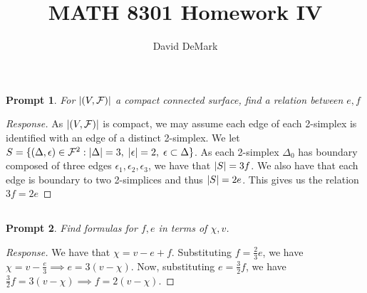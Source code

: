 \documentclass[english]{article}
\title{MATH 8301 Homework IV}
\author{David DeMark}
\date{\due}
\newcommand{\prompt}[1]{\begin{prompt*}
		#1
\end{prompt*}}
\DeclarePairedDelimiter\abs{\lvert}{\rvert}%
\newcommand{\prob}[1]{\setcounter{section}{#1-1}\section{}}
\newcommand{\prt}[1]{\setcounter{subsection}{#1-1}\subsection{}}
\newtheorem*{prompt*}{Prompt}
\theoremstyle{remark}
\theoremstyle{definition}
\newcommand{\Fcal}{\mathcal{F}}
\begin{document}
	\maketitle
\prob{1}
\prt{1} \prompt{For $\abs{(V,\Fcal)}$ a compact connected surface, find a relation between $e,f$}
\begin{proof}[Response]
As $\abs{(V,\Fcal)}$ is compact, we may assume each edge of each 2-simplex is identified with an edge of a distinct 2-simplex. We let $S=\{(\Delta, \epsilon)\in \Fcal^2:\abs{\Delta}=3,\;\abs{\epsilon}=2,\;\epsilon\subset \Delta\}$. As each 2-simplex $\Delta_0$ has boundary composed of three edges $\epsilon_1,\epsilon_2,\epsilon_3$, we have that $\abs{S}=3f$. We also have that each edge is boundary to two 2-simplices and thus $\abs{S}=2e$. This gives us the relation $3f=2e$
\end{proof}
\prt{2}\prompt{Find formulas for $f,e$ in terms of $\chi,v$.}
	\begin{proof}[Response]
We have that $\chi=v-e+f$. Substituting $f=\frac{2}{3}e$, we have $\chi=v-\frac{e}{3}\implies e=3(v-\chi)$. Now, substituting $e=\frac{3}{2}f$, we have $\frac{3}{2}f=3(v-\chi)\implies f=2(v-\chi)$.
	\end{proof}
\end{document}
